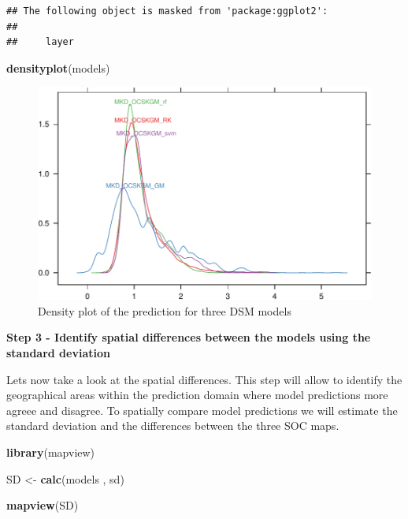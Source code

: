 \documentclass[10pt,b5paper,]{book}
\newenvironment{Shaded}{\begin{snugshade}}{\end{snugshade}}
\newcommand{\KeywordTok}[1]{\textcolor[rgb]{0.13,0.29,0.53}{\textbf{#1}}}
\newcommand{\NormalTok}[1]{#1}
\newcommand{\StringTok}[1]{\textcolor[rgb]{0.31,0.60,0.02}{#1}}
\theoremstyle{definition}
\theoremstyle{definition}
\theoremstyle{definition}
\theoremstyle{remark}
\begin{document}
\begin{verbatim}
## The following object is masked from 'package:ggplot2':
## 
##     layer
\end{verbatim}

\begin{Shaded}
\begin{Highlighting}[]
\KeywordTok{densityplot}\NormalTok{(models)}
\end{Highlighting}
\end{Shaded}

\begin{figure}
\centering
\includegraphics{SOCMapping_files/figure-latex/unnamed-chunk-97-1.pdf}
\caption{\label{fig:unnamed-chunk-97}Density plot of the prediction for
three DSM models}
\end{figure}

\textbf{Step 3 - Identify spatial differences between the models using
the standard deviation}

Lets now take a look at the spatial differences. This step will allow to
identify the geographical areas within the prediction domain where model
predictions more agreee and disagree. To spatially compare model
predictions we will estimate the standard deviation and the differences
between the three SOC maps.

\begin{Shaded}
\begin{Highlighting}[]
\KeywordTok{library}\NormalTok{(mapview)}

\NormalTok{SD <-}\StringTok{ }\KeywordTok{calc}\NormalTok{(models , sd)}

\KeywordTok{mapview}\NormalTok{(SD)}
\end{Highlighting}
\end{Shaded}
\end{document}
